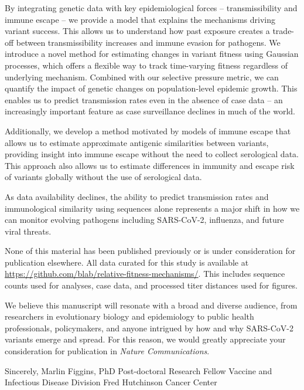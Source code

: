 \documentclass[11pt]{article}
\begin{document}
By integrating genetic data with key epidemiological forces -- transmissibility and immune escape -- we provide a model that explains the mechanisms driving variant success.
This allows us to understand how past exposure creates a trade-off between transmissibility increases and immune evasion for pathogens.
We introduce a novel method for estimating changes in variant fitness using Gaussian processes, which offers a flexible way to track time-varying fitness regardless of underlying mechanism.
Combined with our selective pressure metric, we can quantify the impact of genetic changes on population-level epidemic growth.
This enables us to predict transmission rates even in the absence of case data -- an increasingly important feature as case surveillance declines in much of the world.

Additionally, we develop a method motivated by models of immune escape that allows us to estimate approximate antigenic similarities between variants, providing insight into immune escape without the need to collect serological data.
This approach also allows us to estimate differences in immunity and escape risk of variants globally without the use of serological data.

As data availability declines, the ability to predict transmission rates and immunological similarity using sequences alone represents a major shift in how we can monitor evolving pathogens including SARS-CoV-2, influenza, and future viral threats.

None of this material has been published previously or is under consideration for publication elsewhere.
All data curated for this study is available at \href{https://github.com/blab/relative-fitness-mechanisms/}{https://github.com/blab/relative-fitness-mechanisms/}.
This includes sequence counts used for analyses, case data, and processed titer distances used for figures.

We believe this manuscript will resonate with a broad and diverse audience, from researchers in evolutionary biology and epidemiology to public health professionals, policymakers, and anyone intrigued by how and why SARS-CoV-2 variants emerge and spread.
For this reason, we would greatly appreciate your consideration for publication in \textit{Nature Communications}.

\vspace{0.3in} %

Sincerely, \newline
\vspace{0.05in} \newline
Marlin Figgins, PhD \newline
Post-doctoral Research Fellow \newline
Vaccine and Infectious Disease Division \newline
Fred Hutchinson Cancer Center
\end{document}
